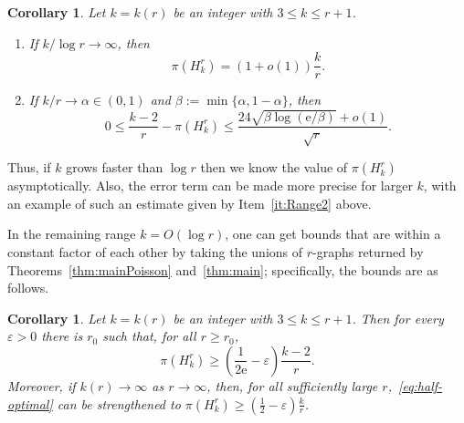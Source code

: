 \documentclass[10pt,a4paper]{article}
\numberwithin{equation}{section}
\newtheorem{corollary}[theorem]{Corollary}
\theoremstyle{definition}
\theoremstyle{remark}
\newcommand{\hide}[1]{{\color{DarkGreen}#1}}
\renewcommand{\hide}[1]{}
\newcommand{\me}{\mathrm{e}}
\begin{document}
\begin{corollary}\label{cor:applications}
	Let $k=k(r)$ be an integer with $3\le k\le r+1$.
	\begin{enumerate}[label=\textup{(\roman*)}]
\hide{		\item\label{it:Range0} If $k/\log r\to c\in(0,\infty)$, then
		\begin{equation*}
			1-24\left(c^{-1/2}+c^{-1}\right)+o(1)
			\le \frac{\pi(H_k^r)}{(k-2)/r}\le1.
		\end{equation*}
	}
		\item\label{it:Range1} If $k/\log r\to\infty$, then
		\begin{equation*}
			\pi(H_k^r)=(1+o(1))\frac{k}{r}.
		\end{equation*}
		\item\label{it:Range2} If $k/r\to\alpha\in(0,1)$ and $\beta:=\min\{\alpha,1-\alpha\}$, then
		\begin{equation*}
			0\le\frac{k-2}{r}-\pi(H_k^r)
			\le\frac{24\sqrt{\beta\log(\me /\beta)}+o(1)}{\sqrt r}.
		\end{equation*}
	\end{enumerate}
\end{corollary}


Thus, if $k$ grows faster than $\log r$ then we know the value of  $\pi(H_k^r)$ asymptotically.
Also, the error term can be made more precise for larger $k$, with an example of such an estimate given by Item~\ref{it:Range2} above. 




In the remaining range $k=O(\log r)$, one can get bounds that are within a constant factor of each other by taking the unions of $r$-graphs returned by Theorems~\ref{thm:mainPoisson} and~\ref{thm:main}; specifically, the bounds are as follows.



\begin{corollary}\label{cor:half-optimal}
	Let $k=k(r)$ be an integer with $3\le k\le r+1$. Then for every $\varepsilon>0$ there is $r_0$ such that, for all $r\ge r_0$, 
	\begin{equation}\label{eq:half-optimal}
		\pi(H_k^r)\ge \left(\frac1{2\me}-\varepsilon\right)\frac{k-2}{r}.
	\end{equation}
	Moreover, if $k(r)\to\infty$ as $r\to \infty$, then, for all sufficiently large $r$,~\eqref{eq:half-optimal} can be strengthened to $\pi(H_k^r)\ge(\frac12-\varepsilon)\frac{k}{r}$.
\end{corollary}
\end{document}
